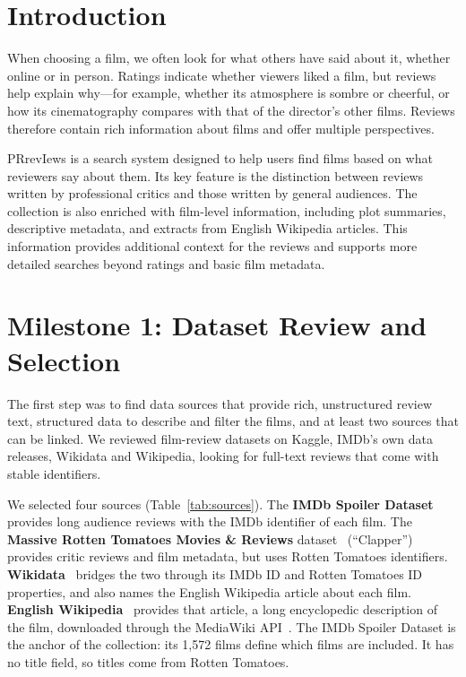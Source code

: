 
\maketitle

\section{Introduction}
When choosing a film, we often look for what others have said about it, whether online or in person. Ratings indicate whether viewers liked a film, but reviews help explain why---for example, whether its atmosphere is sombre or cheerful, or how its cinematography compares with that of the director's other films. Reviews therefore contain rich information about films and offer multiple perspectives.

PRrevIews is a search system designed to help users find films based on what reviewers say about them. Its key feature is the distinction between reviews written by professional critics and those written by general audiences. The collection is also enriched with film-level information, including plot summaries, descriptive metadata, and extracts from English Wikipedia articles. This information provides additional context for the reviews and supports more detailed searches beyond ratings and basic film metadata.

\section{Milestone 1: Dataset Review and Selection}
The first step was to find data sources that provide rich, unstructured review text, structured data to describe and filter the films, and at least two sources that can be linked. We reviewed film-review datasets on Kaggle, IMDb's own data releases, Wikidata and Wikipedia, looking for full-text reviews that come with stable identifiers.

We selected four sources (Table~\ref{tab:sources}). The \textbf{IMDb Spoiler Dataset}~\cite{misra2019} provides long audience reviews with the IMDb identifier of each film. The \textbf{Massive Rotten Tomatoes Movies \& Reviews} dataset~\cite{andrezaza2023} (``Clapper'') provides critic reviews and film metadata, but uses Rotten Tomatoes identifiers. \textbf{Wikidata}~\cite{vrandecic2014, wdqs} bridges the two through its IMDb ID and Rotten Tomatoes ID properties, and also names the English Wikipedia article about each film. \textbf{English Wikipedia}~\cite{wikipedia} provides that article, a long encyclopedic description of the film, downloaded through the MediaWiki API~\cite{mediawikiapi}. The IMDb Spoiler Dataset is the anchor of the collection: its 1,572 films define which films are included. It has no title field, so titles come from Rotten Tomatoes.

